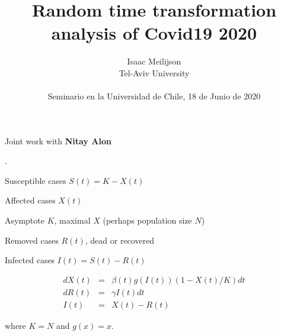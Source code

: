 \documentclass{article}
\begin{document}
\date{}


\title {Random time transformation analysis of Covid19 2020
}

\author {
Isaac Meilijson
\\
{Tel-Aviv University} \\
\\
{Seminario en la Universidad de Chile, 18 de Junio de 2020}
}



\maketitle


\bigskip

\begin{center}

\noindent Joint work with {\bf Nitay Alon}

\end{center}

\newpage



.

\bigskip

\noindent Susceptible cases $S(t) = K - X(t)$

\noindent Affected cases $X(t)$

\noindent Asymptote $K$, maximal $X$ (perhaps population size $N$)

\noindent Removed cases $R(t)$, dead or recovered

\noindent Infected cases $I(t)=S(t)-R(t)$

\begin{eqnarray}
dX(t) & = & \beta(t) g(I(t)) (1 - X(t)/K) dt \nonumber \\
dR(t) & = & \gamma I(t) dt \nonumber \\
I(t) & = & X(t)-R(t) \nonumber
\end{eqnarray}

\noindent where $K=N$ and $g(x)=x$.

\bigskip
\end{document}

